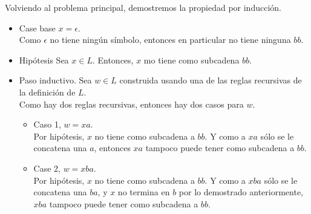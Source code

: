 \documentclass{article}
\begin{document}
\begin{enumerate}
{\begin{enumerate}
{                    Volviendo al problema principal, demostremos la propiedad 
                    por inducción.
                    \begin{itemize}
                        \item {
                            Case base $x = \epsilon$.\\
                            Como $\epsilon$ no tiene ningún símbolo, entonces en
                            particular no tiene ninguna $bb$.
                        }
                        \item {
                            Hipótesis
                            Sea $x \in L$. Entonces, $x$ mo tiene como subcadena 
                            $bb$.
                        }
                        \item {
                            Paso inductivo.
                            Sea $w \in L$ construida usando una de las reglas 
                            recursivas de la definición de $L$.\\
                            Como hay dos reglas recursivas, entonces hay dos 
                            casos para $w$.
                            \begin{itemize}
                                \item {
                                    Caso 1, $w = xa$.\\
                                    Por hipótesis, $x$ no tiene como subcadena a
                                    $bb$. Y como a $xa$ sólo se le concatena 
                                    una $a$, entonces $xa$ tampoco puede tener
                                    como subcadena a $bb$.
                                }
                                \item {
                                    Case 2, $w = xba$. \\
                                    Por hipótesis, $x$ no tiene como subcadena a
                                    $bb$. Y como a $xba$ sólo se le concatena 
                                    una $ba$, y $x$ no termina en $b$ por lo
                                    demostrado anteriormente,  $xba$ tampoco 
                                    puede tener como subcadena a $bb$.
                                }
                            \end{itemize}
                        }
                    \end{itemize}
                }
            \end{enumerate}
            
}
\end{enumerate}
\end{document}
